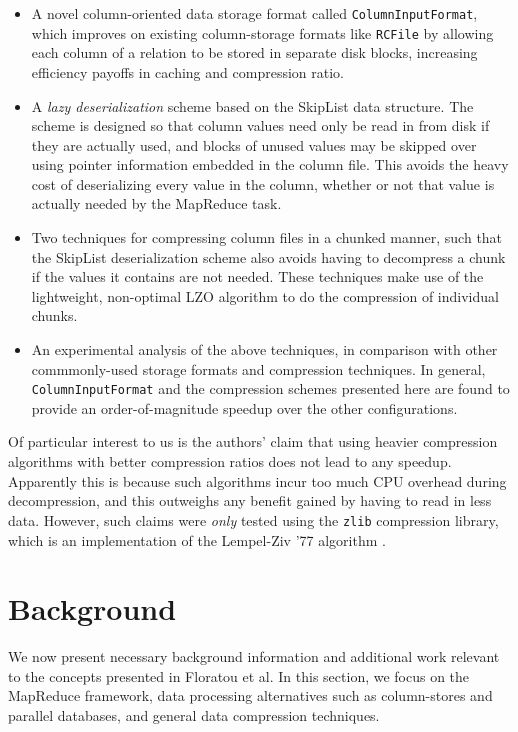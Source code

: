 \documentclass[twocolumn]{article}
\begin{document}
\begin{itemize}
\item A novel column-oriented data storage format called \verb+ColumnInputFormat+,
which improves on existing column-storage formats like \verb+RCFile+ \cite{ref:rcfile}
by allowing each column of a relation to be stored in separate disk blocks, increasing
efficiency payoffs in caching and compression ratio.
\item A \emph{lazy deserialization} scheme based on the SkipList \cite{ref:skiplist}
data structure.  The scheme is designed so that column values need only be read
in from disk if they are actually used, and blocks of unused values may be skipped
over using pointer information embedded in the column file.  This avoids the
heavy cost of deserializing every value in the column, whether or not that value
is actually needed by the MapReduce task.
\item Two techniques for compressing column files in a chunked manner, such that
the SkipList deserialization scheme also avoids having to decompress a chunk if
the values it contains are not needed.  These techniques make use of the lightweight,
non-optimal LZO algorithm \cite{ref:lzo} to do the compression of
individual chunks.
\item An experimental analysis of the above techniques, in comparison with other
commmonly-used storage formats and compression techniques.  In general, 
\verb+ColumnInputFormat+ and the compression schemes presented here are
found to provide an order-of-magnitude speedup over the other configurations.
\end{itemize}

Of particular interest to us is the authors' claim that using heavier compression
algorithms with better compression ratios does not lead to any speedup.  Apparently
this is because such algorithms incur too much CPU overhead during decompression,
and this outweighs any benefit gained by having to read in less data.  However,
such claims were \emph{only} tested using the \verb+zlib+ compression library,
which is an implementation of the Lempel-Ziv '77 algorithm \cite{ref:lz77}.

\section{Background}

We now present necessary background information and additional work
relevant to the concepts presented in Floratou et al.  In this section,
we focus on the MapReduce framework, data processing alternatives such
as column-stores and parallel databases, and general data compression
techniques.
\end{document}
